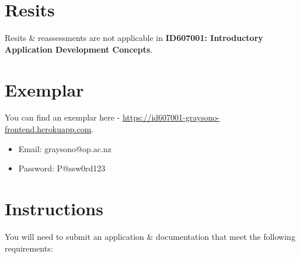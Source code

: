 \documentclass{article}
\begin{document}
\section*{Resits}
Resits \& reassessments are not applicable in \textbf{ID607001: Introductory Application Development Concepts}. 

\newpage

\section*{Exemplar}
You can find an exemplar here - \small\href{https://id607001-graysono-frontend.herokuapp.com}{https://id607001-graysono-frontend.herokuapp.com}.
 
\begin{itemize}
	\item Email: graysono@op.ac.nz
	\item Password: P@ssw0rd123
\end{itemize}

\section*{Instructions}
You will need to submit an application \& documentation that meet the following requirements:
\end{document}
